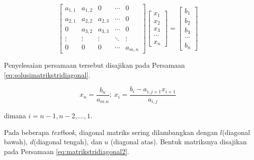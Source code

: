 \documentclass[]{book}
\theoremstyle{definition}
\theoremstyle{definition}
\theoremstyle{definition}
\theoremstyle{remark}
\begin{document}
\begin{equation}
\begin{bmatrix}
     a_{1,1} & a_{1,2} & 0       &\cdots& 0                 \\[0.3em]
     a_{2,1} & a_{2,2} & a_{2,3} &\cdots& 0             \\[0.3em]
     0       & a_{3,2} & a_{3,3} &\cdots& 0             \\[0.3em]
     \vdots  & \vdots  & \vdots  &\ddots& \vdots            \\[0.3em]
     0       & 0       & 0       &\cdots& a_{m,n}
     \end{bmatrix}
\begin{bmatrix}
     x_1                                          \\[0.3em]
     x_2                                          \\[0.3em]
     x_3                                          \\[0.3em]
     \cdots                                       \\[0.3em]
     x_n                                       
     \end{bmatrix}
= \begin{bmatrix}
     b_1                                          \\[0.3em]
     b_2                                          \\[0.3em]
     b_3                                          \\[0.3em]
     \cdots                                       \\[0.3em]
     b_n                                       
     \end{bmatrix}
  \label{eq:matrikstridiagonal}
\end{equation}

Penyelesaian persamaan tersebut disajikan pada Persamaan \eqref{eq:solusimatrikstridiagonal}.

\begin{equation}
x_n=\frac{b_n}{a_{m.n}};\ x_i=\frac{b_i-a_{i,j+1}x_{i+1}}{a_{i,j}}
  \label{eq:solusimatrikstridiagonal}
\end{equation}

dimana \(i=n-1,n-2,\dots,1\).

Pada beberapa \emph{textbook}, diagonal matriks sering dilambangkan dengan \(l\)(diagonal bawah), \(d\)(diagonal tengah), dan \(u\) (diagonal atas). Bentuk matriksnya disajikan pada Persamaan \eqref{eq:matrikstridiagonal2}.
\end{document}
